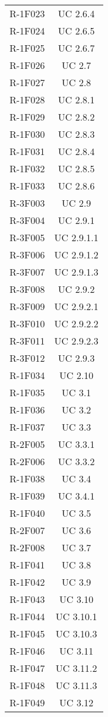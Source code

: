 \begin{tabularx}{\textwidth}{c|c}
		R-1F023 & UC 2.6.4 \\
		R-1F024 & UC 2.6.5 \\
		R-1F025 & UC 2.6.7 \\
		R-1F026 & UC 2.7 \\
		R-1F027 & UC 2.8 \\
		R-1F028 & UC 2.8.1 \\
		R-1F029 & UC 2.8.2 \\
		R-1F030 & UC 2.8.3 \\
		R-1F031 & UC 2.8.4 \\
		R-1F032 & UC 2.8.5 \\
		R-1F033 & UC 2.8.6 \\
		R-3F003 & UC 2.9 \\
		R-3F004 & UC 2.9.1 \\
		R-3F005 & UC 2.9.1.1 \\
		R-3F006 & UC 2.9.1.2 \\
		R-3F007 & UC 2.9.1.3 \\
		R-3F008 & UC 2.9.2 \\
		R-3F009 & UC 2.9.2.1 \\
		R-3F010 & UC 2.9.2.2 \\
		R-3F011 & UC 2.9.2.3 \\
		R-3F012 & UC 2.9.3 \\
		R-1F034 & UC 2.10 \\
		R-1F035 & UC 3.1 \\
		R-1F036 & UC 3.2 \\
		R-1F037 & UC 3.3 \\
		R-2F005 & UC 3.3.1 \\
		R-2F006 & UC 3.3.2 \\
		R-1F038 & UC 3.4 \\
		R-1F039 & UC 3.4.1 \\
		R-1F040 & UC 3.5 \\
		R-2F007 & UC 3.6 \\
		R-2F008 & UC 3.7 \\
		R-1F041 & UC 3.8 \\
		R-1F042 & UC 3.9 \\
		R-1F043 & UC 3.10 \\
		R-1F044 & UC 3.10.1 \\
		R-1F045 & UC 3.10.3 \\
		R-1F046 & UC 3.11 \\
		R-1F047 & UC 3.11.2 \\
		R-1F048 & UC 3.11.3 \\
		R-1F049 & UC 3.12 \\

\end{tabularx}
